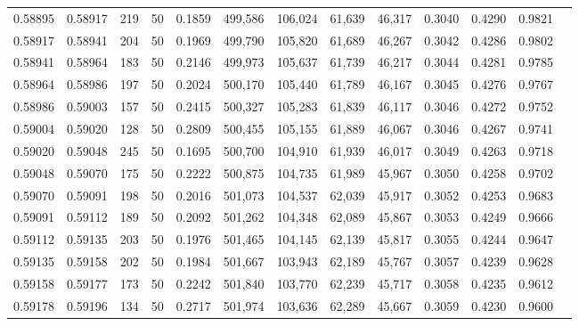 \begin{tabular}{rrrrrrrrrrrrr}
0.58895 & 0.58917 &   219 &  50 &                                     0.1859 & 499,586 & 106,024 &  61,639 &  46,317 & 0.3040 & 0.4290 & 0.9821 \\
0.58917 & 0.58941 &   204 &  50 &                                     0.1969 & 499,790 & 105,820 &  61,689 &  46,267 & 0.3042 & 0.4286 & 0.9802 \\
0.58941 & 0.58964 &   183 &  50 &                                     0.2146 & 499,973 & 105,637 &  61,739 &  46,217 & 0.3044 & 0.4281 & 0.9785 \\
0.58964 & 0.58986 &   197 &  50 &                                     0.2024 & 500,170 & 105,440 &  61,789 &  46,167 & 0.3045 & 0.4276 & 0.9767 \\
0.58986 & 0.59003 &   157 &  50 &                                     0.2415 & 500,327 & 105,283 &  61,839 &  46,117 & 0.3046 & 0.4272 & 0.9752 \\
0.59004 & 0.59020 &   128 &  50 &                                     0.2809 & 500,455 & 105,155 &  61,889 &  46,067 & 0.3046 & 0.4267 & 0.9741 \\
0.59020 & 0.59048 &   245 &  50 &                                     0.1695 & 500,700 & 104,910 &  61,939 &  46,017 & 0.3049 & 0.4263 & 0.9718 \\
0.59048 & 0.59070 &   175 &  50 &                                     0.2222 & 500,875 & 104,735 &  61,989 &  45,967 & 0.3050 & 0.4258 & 0.9702 \\
0.59070 & 0.59091 &   198 &  50 &                                     0.2016 & 501,073 & 104,537 &  62,039 &  45,917 & 0.3052 & 0.4253 & 0.9683 \\
0.59091 & 0.59112 &   189 &  50 &                                     0.2092 & 501,262 & 104,348 &  62,089 &  45,867 & 0.3053 & 0.4249 & 0.9666 \\
0.59112 & 0.59135 &   203 &  50 &                                     0.1976 & 501,465 & 104,145 &  62,139 &  45,817 & 0.3055 & 0.4244 & 0.9647 \\
0.59135 & 0.59158 &   202 &  50 &                                     0.1984 & 501,667 & 103,943 &  62,189 &  45,767 & 0.3057 & 0.4239 & 0.9628 \\
0.59158 & 0.59177 &   173 &  50 &                                     0.2242 & 501,840 & 103,770 &  62,239 &  45,717 & 0.3058 & 0.4235 & 0.9612 \\
0.59178 & 0.59196 &   134 &  50 &                                     0.2717 & 501,974 & 103,636 &  62,289 &  45,667 & 0.3059 & 0.4230 & 0.9600 \\

\end{tabular}
